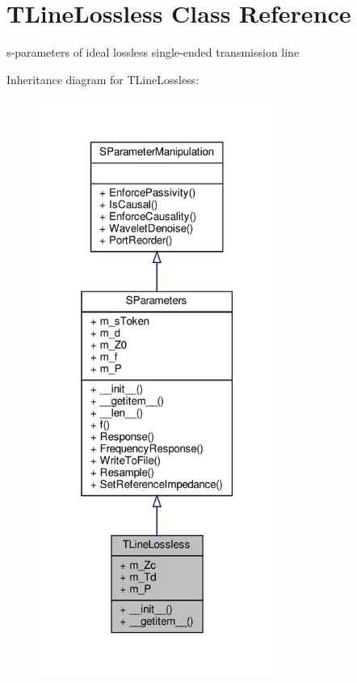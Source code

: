 \hypertarget{classSignalIntegrity_1_1SParameters_1_1Devices_1_1TLineLossless_1_1TLineLossless}{}\section{T\+Line\+Lossless Class Reference}
\label{classSignalIntegrity_1_1SParameters_1_1Devices_1_1TLineLossless_1_1TLineLossless}


s-\/parameters of ideal lossless single-\/ended transmission line  




Inheritance diagram for T\+Line\+Lossless\+:
\nopagebreak
\begin{figure}[H]
\begin{center}
\leavevmode
\includegraphics[width=220pt]{classSignalIntegrity_1_1SParameters_1_1Devices_1_1TLineLossless_1_1TLineLossless__inherit__graph}
\end{center}
\end{figure}


